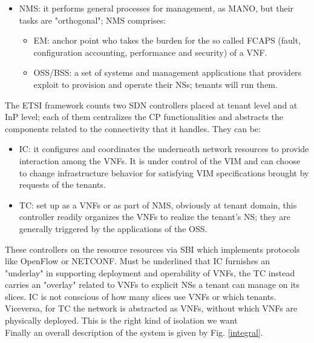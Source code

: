 \documentclass[a4paper,12pt]{report} %
\begin{document}
\begin{itemize}
\item \gls{NMS}: it performs general processes for management, as MANO, but their tasks are "orthogonal"; NMS comprises:
\begin{itemize}
\item \gls{EM}: anchor point who takes the burden for the so called FCAPS (fault, configuration accounting, performance and security) of a VNF.
\end{itemize}
\begin{itemize}
\item \gls{OSS/BSS}: a set of systems and management applications that providers exploit to provision and operate their NSs;  tenants will run them.
\end{itemize}
\end{itemize}
The ETSI framework counts two SDN controllers placed at tenant level and at InP level; each of them centralizes
the CP functionalities and abstracts the components related to the connectivity that it handles. They can be:
\begin{itemize}
\item \gls{IC}: it configures and coordinates the underneath network resources to provide interaction among the VNFs.
It is under control of the VIM and can choose to change
infrastructure behavior for satisfying
VIM specifications brought by requests of the tenants.
\end{itemize}
\begin{itemize}
\item \gls{TC}: set up as a VNFs or as
part of NMS, obviously at tenant domain, this controller readily organizes the VNFs to realize
the tenant’s NS; they are generally triggered by the applications of the OSS.
\end{itemize}
These controllers on the resource resources via SBI which implements protocols like
OpenFlow or NETCONF. Must be underlined that IC furnishes an "underlay" in supporting
deployment and operability of VNFs, the
TC instead carries an "overlay" related to VNFs
to explicit NSs a tenant can manage on
its slices. IC is not conscious of how many slices use VNFs 
or which tenants. Viceversa,
for TC the network is abstracted as VNFs,
without which VNFs are physically
deployed. This is the right kind of isolation we want \\
Finally an overall description of the system is given by Fig. \ref{integral}.
\end{document}
